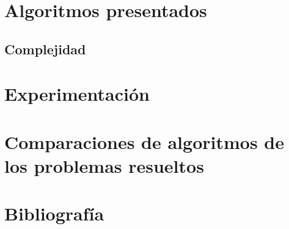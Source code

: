 \documentclass[8pt,a4paper]{article}
\begin{document}
\section{Algoritmos presentados}
\subsection{Complejidad}
\section{Experimentación}

\section{Comparaciones de algoritmos de los problemas resueltos}

\section{Bibliografía}
\end{document}
